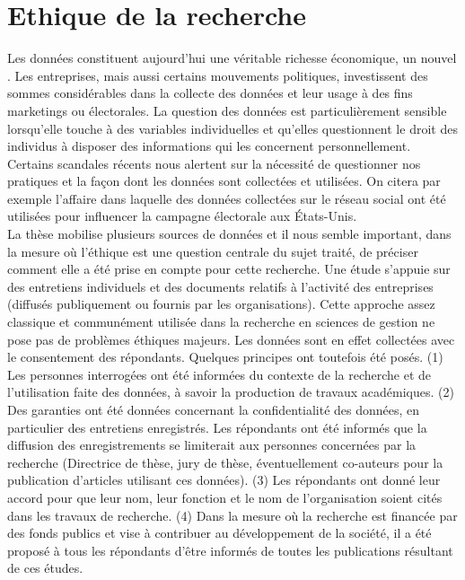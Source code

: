 \section{Ethique de la recherche}

Les données constituent aujourd’hui une véritable richesse économique, un nouvel . Les entreprises, mais aussi certains mouvements politiques, investissent des sommes considérables dans la collecte des données et leur usage à des fins marketings ou électorales. La question des données est particulièrement sensible lorsqu’elle touche à des variables individuelles et qu’elles questionnent le droit des individus à disposer des informations qui les concernent personnellement. Certains scandales récents nous alertent sur la nécessité de questionner nos pratiques et la façon dont les données sont collectées et utilisées. On citera par exemple l’affaire  dans laquelle des données collectées sur le réseau social ont été utilisées pour influencer la campagne électorale aux États-Unis. \\

La thèse mobilise plusieurs sources de données et il nous semble important, dans la mesure où l’éthique est une question centrale du sujet traité, de préciser comment elle a été prise en compte pour cette recherche. Une étude s’appuie sur des entretiens individuels et des documents relatifs à l’activité des entreprises (diffusés publiquement ou fournis par les organisations). Cette approche assez classique et communément utilisée dans la recherche en sciences de gestion ne pose pas de problèmes éthiques majeurs. Les données sont en effet collectées avec le consentement des répondants. Quelques principes ont toutefois été posés. (1) Les personnes interrogées ont été informées du contexte de la recherche et de l’utilisation faite des données, à savoir la production de travaux académiques. (2) Des garanties ont été données concernant la confidentialité des données, en particulier des entretiens enregistrés. Les répondants ont été informés que la diffusion des enregistrements se limiterait aux personnes concernées par la recherche (Directrice de thèse, jury de thèse, éventuellement co-auteurs pour la publication d’articles utilisant ces données). (3) Les répondants ont donné leur accord pour que leur nom, leur fonction et le nom de l’organisation soient cités dans les travaux de recherche. (4) Dans la mesure où la recherche est financée par des fonds publics et vise à contribuer au développement de la société, il a été proposé à tous les répondants d’être informés de toutes les publications résultant de ces études. \\


